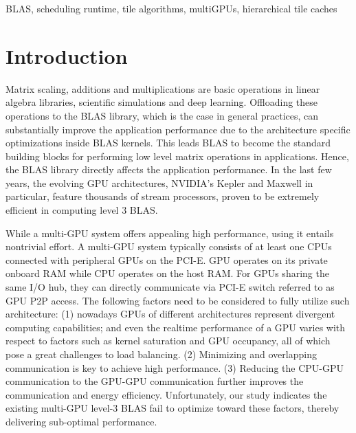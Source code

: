\documentclass[conference]{IEEEtran}
\begin{document}
\begin{IEEEkeywords}
BLAS, scheduling runtime, tile algorithms, multiGPUs, hierarchical tile caches 
\end{IEEEkeywords}

\vspace{-0.1in}
\section{Introduction}
Matrix scaling, additions and multiplications are basic operations in linear algebra libraries, 
scientific simulations and deep learning. Offloading these operations to the BLAS library, 
which is the case in general practices, can substantially improve the application performance 
due to the architecture specific optimizations inside BLAS kernels. This leads BLAS to become the 
standard building blocks for performing low level matrix operations in applications. Hence, 
the BLAS library directly affects the application performance. In the last few years, 
the evolving GPU architectures, NVIDIA's Kepler and Maxwell in particular, feature thousands
of stream processors, proven to be extremely efficient in computing level 3 BLAS.

While a multi-GPU system offers appealing high performance, using it entails nontrivial effort. 
A multi-GPU system typically consists of at least one CPUs connected with peripheral GPUs on 
the PCI-E. GPU operates on its private onboard RAM while CPU operates on the host RAM. 
For GPUs sharing the same I/O hub, they can directly communicate via PCI-E switch referred to
as GPU P2P access. The following factors need to be considered to fully utilize such architecture: 
(1) nowadays GPUs of different architectures represent divergent computing 
capabilities; and even the realtime performance of a GPU varies with respect to factors 
such as kernel saturation and GPU occupancy, all of which pose a great challenges to load 
balancing. (2) Minimizing and overlapping communication is key to achieve
high performance. (3) Reducing the CPU-GPU communication to the GPU-GPU communication
further improves the communication and energy efficiency. Unfortunately, 
our study indicates the existing multi-GPU level-3 BLAS fail to optimize toward these factors,
thereby delivering sub-optimal performance.
\end{document}
